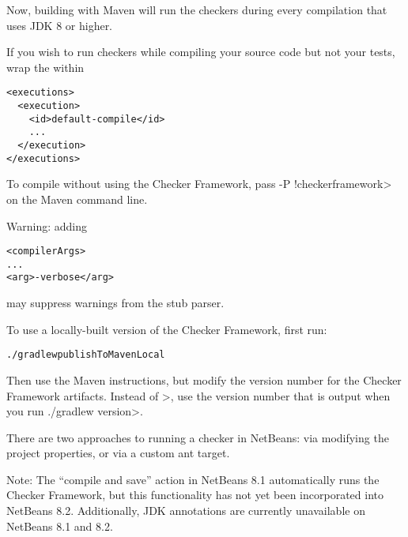 \begin{enumerate}
Now, building with Maven will run the checkers during every compilation
that uses JDK 8 or higher.

If you wish to run checkers while compiling your source code but not your
tests, wrap the  within

\begin{Verbatim}
<executions>
  <execution>
    <id>default-compile</id>
    ...
  </execution>
</executions>
\end{Verbatim}

To compile without using the Checker Framework, pass
\<-P !checkerframework>
on the Maven command line.

Warning:  adding

\begin{mysmall}
\begin{alltt}
<compilerArgs>
  ...
  <arg>-verbose</arg>
\end{alltt}
\end{mysmall}

\noindent
may suppress warnings from the stub parser.

\end{enumerate}



To use a locally-built version of the Checker Framework, first run:

\begin{alltt}
./gradlew publishToMavenLocal
\end{alltt}

\noindent
Then use the Maven instructions, but modify the version number for the
Checker Framework artifacts.  Instead of \<\ReleaseVersion{}>, use the
version number that is output when you run \<./gradlew version>.



There are two approaches to running a checker in NetBeans:  via modifying the
project properties, or via a custom ant target.

Note: The ``compile and save'' action in NetBeans 8.1 automatically
runs the Checker Framework, but this functionality has not yet
been incorporated into NetBeans 8.2. Additionally, JDK annotations
are currently unavailable on NetBeans 8.1 and 8.2.

